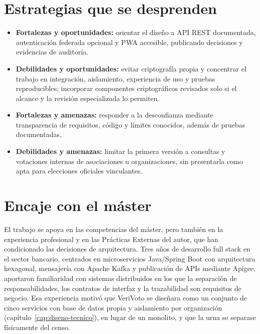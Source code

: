 \section{Estrategias que se desprenden}
\label{sec:estrategias-dafo}

\begin{itemize}
  \item \textbf{Fortalezas y oportunidades:} orientar el diseño a API REST
  documentada, autenticación federada opcional y PWA accesible, publicando decisiones y
  evidencias de auditoría.
  \item \textbf{Debilidades y oportunidades:} evitar criptografía propia y
  concentrar el trabajo en integración, aislamiento, experiencia de uso y
  pruebas reproducibles; incorporar componentes criptográficos revisados solo
  si el alcance y la revisión especializada lo permiten.
  \item \textbf{Fortalezas y amenazas:} responder a la desconfianza mediante
  transparencia de requisitos, código y límites conocidos, además de pruebas
  documentadas.
  \item \textbf{Debilidades y amenazas:} limitar la primera versión a
  consultas y votaciones internas de asociaciones u organizaciones, sin
  presentarla como apta para elecciones oficiales vinculantes.
\end{itemize}

\section{Encaje con el máster}
\label{sec:encaje-master}

El trabajo se apoya en las competencias del máster, pero también en la
experiencia profesional y en las Prácticas Externas del autor, que han
condicionado las decisiones de arquitectura. Tres años de desarrollo full
stack en el sector bancario, centrados en microservicios Java/Spring Boot con
arquitectura hexagonal, mensajería con Apache Kafka y publicación de APIs
mediante Apigee, aportaron familiaridad con sistemas distribuidos en los que
la separación de responsabilidades, los contratos de interfaz y la
trazabilidad son requisitos de negocio. Esa experiencia motivó que VeriVoto se
diseñara como un conjunto de cinco servicios con base de datos propia y
aislamiento por organización (capítulo~\ref{cap:diseno-tecnico}), en lugar de
un monolito, y que la urna se separase físicamente del censo.

